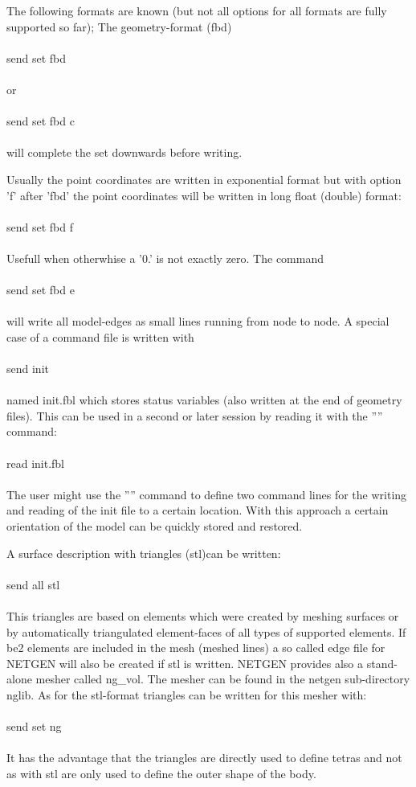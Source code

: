 \documentclass{article}
\begin{document}
The following formats are known (but not all options for all formats are fully supported so far); The geometry-format (fbd)\\\\send set fbd\\\\or\\\\send set fbd c\\\\will complete the set downwards before writing.

Usually the point coordinates are written in exponential format but with option 'f' after 'fbd' the point coordinates will be written in long float (double) format:\\\\send set fbd f\\\\Usefull when otherwhise a '0.' is not exactly zero. The command \\\\send set fbd e\\\\will write all model-edges as small lines running from node to node. A special case of a command file is written with\\\\send init\\\\named init.fbl which stores status variables (also written at the end of geometry files). This can be used in a second or later session by reading it with the '''' command:\\\\read init.fbl\\\\The user might use the '''' command to define two command lines for the writing and reading of the init file to a certain location. With this approach a certain orientation of the model can be quickly stored and restored.

A surface description with triangles (stl)can be written:\\\\send all stl\\\\This triangles are based on elements which were created by meshing surfaces or by automatically triangulated element-faces of all types of supported elements. If be2 elements are included in the mesh (meshed lines) a so called edge file for NETGEN will also be created if stl is written. NETGEN provides also a stand-alone mesher called ng\_vol. The mesher can be found in the netgen sub-directory nglib. As for the stl-format triangles can be written for this mesher with:\\\\send set ng\\\\It has the advantage that the triangles are directly used to define tetras and not as with stl are only used to define the outer shape of the body.
\end{document}
